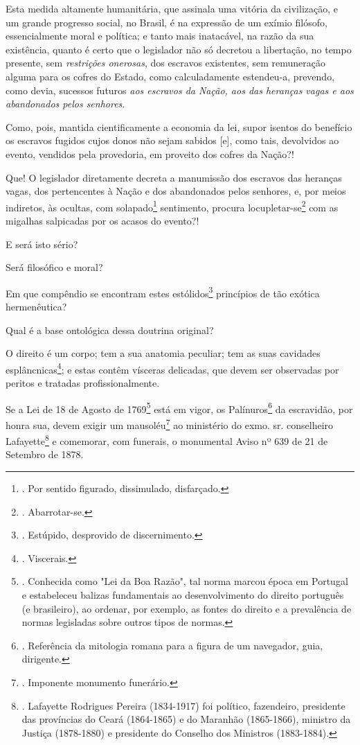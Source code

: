 Esta medida altamente humanitária, que assinala uma vitória da
civilização, e um grande progresso social, no Brasil, é na expressão de
um exímio filósofo, essencialmente moral e política; e tanto mais
inatacável, na razão da sua existência, quanto é certo que o legislador
não só decretou a libertação, no tempo presente, sem \emph{restrições
onerosas}, dos escravos existentes, sem remuneração alguma para os
cofres do Estado, como calculadamente estendeu-a, prevendo, como devia,
sucessos futuros \emph{aos escravos da Nação, aos das heranças vagas e
aos abandonados pelos senhores}.

Como, pois, mantida cientificamente a economia da lei, supor isentos do
benefício os escravos fugidos cujos donos não sejam sabidos {[}e{]},
como tais, devolvidos ao evento, vendidos pela provedoria, em proveito
dos cofres da Nação?!

Que! O legislador diretamente decreta a manumissão dos escravos das
heranças vagas, dos pertencentes à Nação e dos abandonados pelos
senhores, e, por meios indiretos, às ocultas, com solapado\footnote{.
  Por sentido figurado, dissimulado, disfarçado.} sentimento, procura
locupletar-se\footnote{. Abarrotar-se.} com as migalhas salpicadas por
os acasos do evento?!

E será isto sério?

Será filosófico e moral?

Em que compêndio se encontram estes estólidos\footnote{. Estúpido,
  desprovido de discernimento.} princípios de tão exótica hermenêutica?

Qual é a base ontológica dessa doutrina original?

O direito é um corpo; tem a sua anatomia peculiar; tem as suas cavidades
esplâncnicas\footnote{. Viscerais.}; e estas contêm vísceras delicadas,
que devem ser observadas por peritos e tratadas profissionalmente.

Se a Lei de 18 de Agosto de 1769\footnote{. Conhecida como "Lei da Boa
  Razão", tal norma marcou época em Portugal e estabeleceu balizas
  fundamentais ao desenvolvimento do direito português (e brasileiro),
  ao ordenar, por exemplo, as fontes do direito e a prevalência de
  normas legisladas sobre outros tipos de normas.} está em vigor, os
Palínuros\footnote{. Referência da mitologia romana para a figura de um
  navegador, guia, dirigente.} da escravidão, por honra sua, devem
exigir um mausoléu\footnote{. Imponente monumento funerário.} ao
ministério do exmo. sr. conselheiro Lafayette\footnote{. Lafayette
  Rodrigues Pereira (1834-1917) foi político, fazendeiro, presidente das
  províncias do Ceará (1864-1865) e do Maranhão (1865-1866), ministro da
  Justiça (1878-1880) e presidente do Conselho dos Ministros
  (1883-1884).} e comemorar, com funerais, o monumental Aviso nº 639 de
21 de Setembro de 1878.

